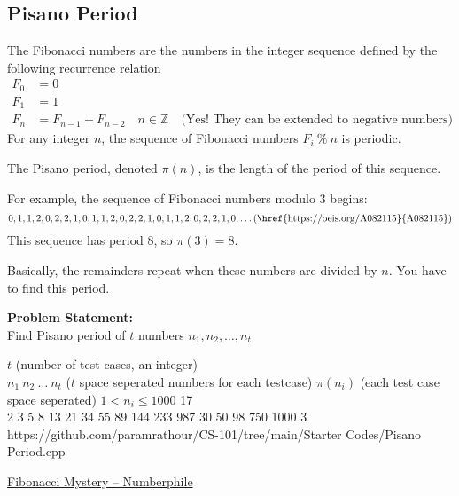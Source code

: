 \documentclass[../../Problems]{subfiles}
\begin{document}
\subsection{Pisano Period}
The Fibonacci numbers are the numbers in the integer sequence defined by the following recurrence relation
\begin{equation}
	\begin{aligned}
		F_0 &= 0\\
		F_1 &= 1 \\
		F_n &= F_{n-1} + F_{n-2}\quad n \in \mathbb{Z}\quad\text{(Yes! They can be extended to negative numbers)}
	\end{aligned}
\end{equation}
For any integer $n$, the sequence of Fibonacci numbers $F_i \ \%\ n$ is periodic.

The Pisano period, denoted $\pi(n)$, is the length of the period of this sequence.

For example, the sequence of Fibonacci numbers modulo 3 begins:
\begin{equation*}
	0, 1, 1, 2, 0, 2, 2, 1, 0, 1, 1, 2, 0, 2, 2, 1, 0, 1, 1, 2, 0, 2, 2, 1, 0,\ldots\text{(\href{https://oeis.org/A082115}{A082115})}
\end{equation*}
This sequence has period 8, so $\pi(3) = 8$.

Basically, the remainders repeat when these numbers are divided by $n$. You have to find this period.

\textbf{Problem Statement:}\\
Find Pisano period of $t$ numbers $n_1,n_2,\ldots,n_t$
\begin{testcases}
	{$t$ \hfill(number of test cases, an integer)\\
	$n_1\ n_2\ \ldots\ n_t$ \hfill($t$ space seperated numbers for each testcase)}
	{$\pi(n_i)$ \hfill(each test case space seperated)}
	{$1 < n_i \leq 1000$}
	{17\\2 3 5 8 13 21 34 55 89 144 233 987 30 50 98 750 1000}
	{3}
	{https://github.com/paramrathour/CS-101/tree/main/Starter Codes/Pisano Period.cpp}
\end{testcases}
\begin{funvideo}
\href{https://youtu.be/Nu-lW-Ifyec}{Fibonacci Mystery -- Numberphile}
\end{funvideo}
\end{document}
